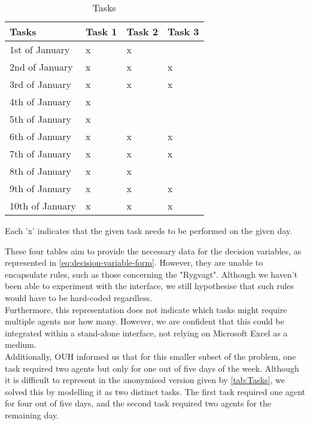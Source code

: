 \begin{table}[H]
    \centering
    \begin{tabular}{|l|l|l|l|}
        \hline
        \textbf{Tasks} & \textbf{Task 1} & \textbf{Task 2} & \textbf{Task 3} \\ \hline
        1st of January       & x               & x               &                 \\ \hline
        2nd of January       & x               & x               & x               \\ \hline
        3rd of January       & x               & x               & x               \\ \hline
        4th of January       & x               &                 &                 \\ \hline
        5th of January       & x               &                 &                 \\ \hline
        6th of January       & x               & x               & x               \\ \hline
        7th of January       & x               & x               & x               \\ \hline
        8th of January       & x               & x               &                 \\ \hline
        9th of January       & x               & x               & x               \\ \hline
        10th of January      & x               & x               & x               \\ \hline
    \end{tabular}
    \caption{Tasks}
    \small
    \raggedright
    Each 'x' indicates that the given task needs to be performed on the given day.
    \label{tab:Tasks}
\end{table}
These four tables aim to provide the necessary data for the decision variables, as represented in \autoref{eq:decision-variable-form}. However, they are unable to encapsulate rules, such as those concerning the "Rygvagt". Although we haven't been able to experiment with the interface, we still hypothesise that such rules would have to be hard-coded regardless.
\\
Furthermore, this representation does not indicate which tasks might require multiple agents nor how many. However, we are confident that this could be integrated within a stand-alone interface, not relying on Microsoft Excel as a medium.
\\
Additionally, OUH informed us that for this smaller subset of the problem, one task required two agents but only for one out of five days of the week. Although it is difficult to represent in the anonymised version given by \autoref{tab:Tasks}, we solved this by modelling it as two distinct tasks. The first task required one agent for four out of five days, and the second task required two agents for the remaining day. 
